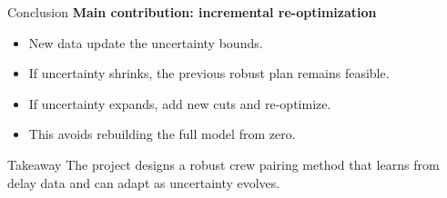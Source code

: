 \documentclass[aspectratio=169]{beamer}
\begin{document}
\begin{frame}{Conclusion}
  \textbf{Main contribution: incremental re-optimization}

  \vspace{0.3cm}
  \begin{itemize}
    \item New data update the uncertainty bounds.
    \item If uncertainty shrinks, the previous robust plan remains feasible.
    \item If uncertainty expands, add new cuts and re-optimize.
    \item This avoids rebuilding the full model from zero.
  \end{itemize}

  \vspace{0.4cm}
  \begin{block}{Takeaway}
    The project designs a robust crew pairing method that learns from delay
    data and can adapt as uncertainty evolves.
  \end{block}
\end{frame}
\end{document}
